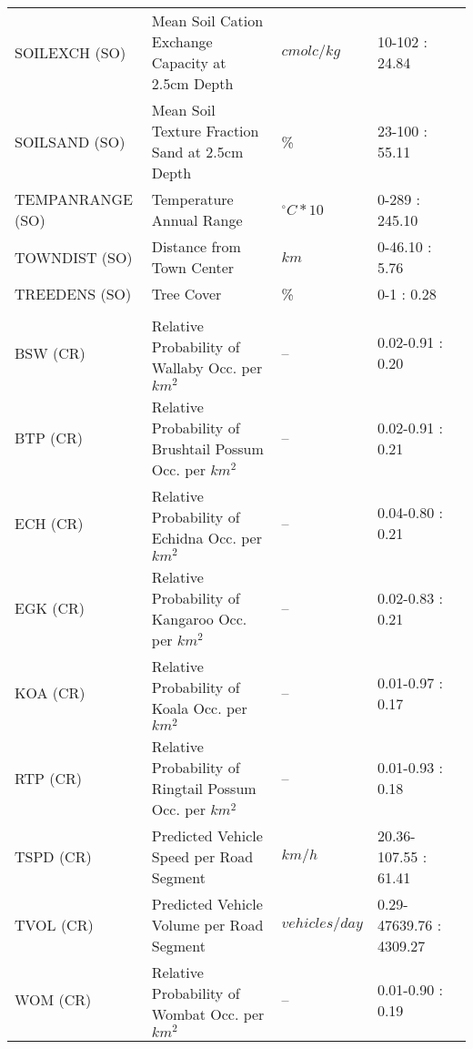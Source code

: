 \begin{table}[ht]
{\begin{tabular}{llllr}
SOILEXCH (SO)   &Mean Soil Cation Exchange Capacity at 2.5cm Depth        &$cmolc/kg$     &10-102 : 24.84\\
SOILSAND (SO)   &Mean Soil Texture Fraction Sand at 2.5cm Depth           &\%             &23-100 : 55.11\\
TEMPANRANGE (SO)&Temperature Annual Range                                 &$^{\circ}C*10$ &0-289 : 245.10\\
TOWNDIST (SO)   &Distance from Town Center                                &$km$           &0-46.10 : 5.76\\
TREEDENS (SO)   &Tree Cover                                               &\%             &0-1 : 0.28\\
&&&\\
BSW (CR)        &Relative Probability of Wallaby Occ. per $km^2$          &--             &0.02-0.91 : 0.20\\
BTP (CR)        &Relative Probability of Brushtail Possum Occ. per $km^2$ &--             &0.02-0.91 : 0.21\\
ECH (CR)        &Relative Probability of Echidna Occ. per $km^2$          &--             &0.04-0.80 : 0.21\\
EGK (CR)        &Relative Probability of Kangaroo Occ. per $km^2$         &--             &0.02-0.83 : 0.21\\
KOA (CR)        &Relative Probability of Koala Occ. per $km^2$            &--             &0.01-0.97 : 0.17\\
RTP (CR)        &Relative Probability of Ringtail Possum Occ. per $km^2$  &--             &0.01-0.93 : 0.18\\
TSPD (CR)       &Predicted Vehicle Speed per Road Segment                 &$km/h$         &20.36-107.55 : 61.41\\
TVOL (CR)       &Predicted Vehicle Volume per Road Segment                &$vehicles/day$ &0.29-47639.76 : 4309.27\\
WOM (CR)        &Relative Probability of Wombat Occ. per $km^2$           &--             &0.01-0.90 : 0.19\\
\bottomrule
\end{tabular}
}
\label{variables_7sp}
\end{table}

